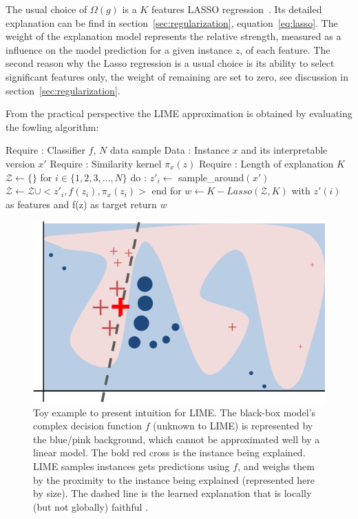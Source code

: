 The usual choice of $\Omega(g)$ is a $K$ features LASSO regression~\cite{LASSO}. Its detailed explanation can be find in section~\ref{sec:regularization}, equation~\ref{eq:lasso}.
The weight of the explanation model represents the relative strength, measured as a influence on the model prediction for a given instance $z$, of each feature. The second reason why the Lasso regression is a usual choice is its ability to select significant features only, the weight of remaining are set to zero, see discussion in section~\ref{sec:regularization}. 

From the practical perspective the LIME approximation is obtained by evaluating the fowling algorithm:

\begin{algorithm}[caption={Model explanation using LIME}, label={alg:LIME}]
Require : Classifier $f$, $N$ data sample
Data :  Instance $x$ and its interpretable version $x'$
Require : Similarity kernel $\pi_x(z)$
Require :  Length of explanation $K$
$\mathcal{Z} \leftarrow \{\}$
for  $i \in \{ 1, 2, 3, \ldots, N \}$ do : 
   $z'_{i} \leftarrow$ sample_around$(x')$
   $\mathcal{Z}  \leftarrow  \mathcal{Z} \cup  < z'_i, f(z_i),\pi_x(z_i) > $ 
   end for
$w \leftarrow  K-Lasso(\mathcal{Z}, K)$ with $z'(i)$ as features and f(z) as target
return $w$
\end{algorithm}

\begin{figure}
\centering
\includegraphics[scale=0.7]{figures/lime.png}
\caption{Toy example to present intuition for LIME. The black-box model's complex decision function $f$ (unknown to LIME) is represented by the blue/pink background, which cannot be approximated well by a linear model. The bold red cross is the instance
being explained. LIME samples instances gets predictions using $f$, and weighs them by the proximity to the instance being explained (represented here by size). The dashed line is the learned explanation that is locally (but not globally) faithful \cite{lime}. 
\label{fig:lime}}
\end{figure} 


